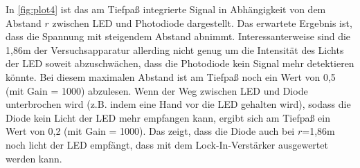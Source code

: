 In \ref{fig:plot4} ist das am Tiefpaß integrierte Signal in Abhängigkeit von
dem Abstand $r$ zwischen LED und Photodiode dargestellt. Das erwartete Ergebnis
ist, dass die Spannung mit steigendem Abstand abnimmt. Interessanterweise
sind die 1,86m der Versuchsapparatur allerding nicht genug um die Intensität
des Lichts der LED soweit abzuschwächen, dass die Photodiode kein Signal
mehr detektieren könnte. Bei diesem maximalen Abstand ist am Tiefpaß noch ein
Wert von 0,5 (mit Gain = 1000) abzulesen. Wenn der Weg zwischen LED und
Diode unterbrochen wird (z.B. indem eine Hand vor die LED gehalten wird),
sodass die Diode kein Licht der LED mehr empfangen kann, ergibt sich am
Tiefpaß ein Wert von 0,2 (mit Gain = 1000). Das zeigt, dass die Diode auch
bei $r$=1,86m noch licht der LED empfängt, dass mit dem Lock-In-Verstärker
ausgewertet werden kann.
